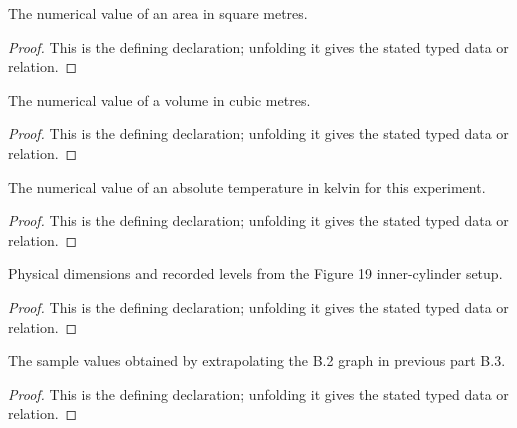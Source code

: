 \begin{definition}[areaInSquareMeters]
  \label{decl:physics:IPhO_2026_4_B_4:areaInSquareMeters}
  The numerical value of an area in square metres.
\end{definition}
\begin{proof}
  This is the defining declaration; unfolding it gives the stated typed data or relation.
\end{proof}

\begin{definition}[volumeInCubicMeters]
  \label{decl:physics:IPhO_2026_4_B_4:volumeInCubicMeters}
  The numerical value of a volume in cubic metres.
\end{definition}
\begin{proof}
  This is the defining declaration; unfolding it gives the stated typed data or relation.
\end{proof}

\begin{definition}[temperatureInKelvin]
  \label{decl:physics:IPhO_2026_4_B_4:temperatureInKelvin}
  The numerical value of an absolute temperature in kelvin for this experiment.
\end{definition}
\begin{proof}
  This is the defining declaration; unfolding it gives the stated typed data or relation.
\end{proof}

\begin{definition}
  \label{decl:physics:IPhO_2026_4_B_4:Figure19CylinderGeometry}
  Physical dimensions and recorded levels from the Figure 19 inner-cylinder setup.
\end{definition}
\begin{proof}
  This is the defining declaration; unfolding it gives the stated typed data or relation.
\end{proof}

\begin{definition}
  \label{decl:physics:IPhO_2026_4_B_4:PreviousPartB3Readout}
  The sample values obtained by extrapolating the B.2 graph in previous part B.3.
\end{definition}
\begin{proof}
  This is the defining declaration; unfolding it gives the stated typed data or relation.
\end{proof}

